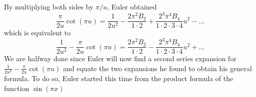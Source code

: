 By multiplying both sides by $\pi/u$, Euler obtained
$$\frac{\pi}{2u}\cot(\pi u) = \frac{1}{2 u^2} - \frac{2 \pi^2 B_2}{1\cdot 2} + \frac{2^3 \pi^4 B_4}{1\cdot 2 \cdot 3 \cdot 4}u^2 - ...$$
which is equivalent to
\begin{equation}
    \frac{1}{2 u^2} - \frac{\pi}{2u}\cot(\pi u) = \frac{2 \pi^2 B_2}{1\cdot 2} - \frac{2^3 \pi^4 B_4}{1\cdot 2 \cdot 3 \cdot 4}u^2 + ...
\end{equation}
We are halfway done since Euler will now find a second series expansion for $\frac{1}{2 u^2} - \frac{\pi}{2u}\cot(\pi u)$ and equate the two expansions he found to obtain his general formula. To do so, Euler started this time from the product formula of the function $\sin(\pi x)$ \td 

\td 